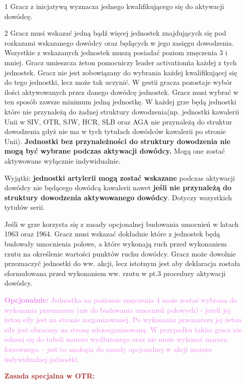 \begin{itemize}
  \item[1]
        Gracz z inicjatywą wyznacza jednego kwalifikującego się do aktywacji dowódcę.
  \item[2]
        Gracz musi wskazać jedną bądź więcej jednostek znajdujących się pod rozkazami wskazanego dowódcy oraz będących w jego zasięgu dowodzenia.    Wszystkie z wskazanych jednostek muszą posiadać poziom zmęczenia 3 i mniej. Gracz umieszcza żeton pomocniczy \"leader activation\" na każdej z tych jednostek. Gracz nie jest zobowiązany do wybrania każdej kwalifikującej się do tego jednostki, lecz może tak uczynić. W gestii gracza pozostaje wybór ilości aktywowanych przez danego dowódcę jednostek. Gracz musi wybrać w ten sposób zawsze minimum jedną jednostkę. W każdej grze będą jednostki które nie przynależą do żadnej struktury dowodzenia(np. jednostki kawalerii Unii w SIV, OTR, SJW, HCR, SLB oraz AGA nie przynależą do struktur dowodzenia gdyż nie ma w tych tytułach dowódców kawalerii po stronie Unii). \textbf{Jednostki bez przynależności do struktury dowodzenia nie mogą być wybrane podczas aktywacji dowódcy.} Mogą one zostać aktywowane wyłącznie indywidualnie.\par
        Wyjątki: \textbf{jednostki artylerii mogą zostać wskazane} podczas aktywacji dowódcy nie będącego dowódcą kawalerii nawet \textbf{jeśli nie przynależą do struktury dowodzenia aktywowanego dowódcy}. Dotyczy wszystkich tytułów serii.\par
        Jeśli w grze korzysta się z zasady opcjonalnej budowania umocnień w latach 1963 oraz 1964. Gracz musi wskazać dokładnie które z jednostek będą budowały umocnienia polowe, a które wykonają ruch przed wykonaniem rzutu na określenie wartości punktów ruchu dowódcy. Gracz może dowolnie przeznaczyć jednostki do ww. akcji, lecz istotnym jest aby deklaracja została sformułowana przed wykonaniem ww. rzutu w pt.3 procedury aktywacji dowódcy.\par
        \textcolor{violet}{\textbf{Opcjonalnie: }Jednostka na poziomie zmęczenia 4 może zostać wybrana do wykonania przemarszu (nie do budowania umocnień polowych) - jeżeli jej żeton siły jest na stronie zorganizowanej. Po wykonaniu przemarszu jej żeton siły jest obracany na stronę zdezorganizowaną. W przypadku takim gracz nie odnosi się do tabeli marszu wydłużonego oraz nie może wykonać marszu forsownego. - jest to analogia do zasady opcjonalnej w akcji marszu indywidualnej jednostki.}\par
        \textcolor{brown}{\textbf{Zasada specjalna w OTR: }\par
}
\end{itemize}
